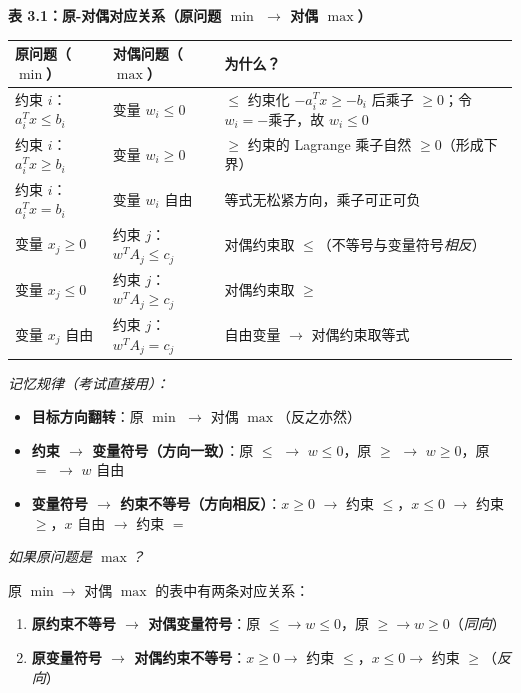 \begin{defbox}
\textbf{表 3.1：原-对偶对应关系（原问题 $\min$ $\to$ 对偶 $\max$）}
\medskip

\begingroup
\footnotesize
\renewcommand{\arraystretch}{1.3}
\begin{tabular}{@{}p{2.6cm}p{3.0cm}p{4.4cm}@{}}
\toprule
\textbf{原问题（$\min$）} & \textbf{对偶问题（$\max$）} & \textbf{为什么？} \\
\midrule
约束 $i$：$a_i^T x \le b_i$ & 变量 $w_i \le 0$ &
  $\le$ 约束化 $-a_i^T x \ge -b_i$ 后乘子 $\ge 0$；令 $w_i=-$乘子，故 $w_i\le0$ \\

约束 $i$：$a_i^T x \ge b_i$ & 变量 $w_i \ge 0$ &
  $\ge$ 约束的 Lagrange 乘子自然 $\ge 0$（形成下界） \\

约束 $i$：$a_i^T x = b_i$  & 变量 $w_i$ 自由 &
  等式无松紧方向，乘子可正可负 \\[3pt]

变量 $x_j \ge 0$  & 约束 $j$：$w^T A_j \le c_j$ &
  对偶约束取 $\le$（不等号与变量符号\emph{相反}） \\

变量 $x_j \le 0$  & 约束 $j$：$w^T A_j \ge c_j$ &
  对偶约束取 $\ge$ \\

变量 $x_j$ 自由   & 约束 $j$：$w^T A_j = c_j$ &
  自由变量 $\to$ 对偶约束取等式 \\
\bottomrule
\end{tabular}
\endgroup
\end{defbox}

\emph{记忆规律（考试直接用）：}
\begin{itemize}
  \item \textbf{目标方向翻转}：原 $\min$ $\to$ 对偶 $\max$（反之亦然）
  \item \textbf{约束 $\to$ 变量符号（方向一致）}：原 $\le$ $\to$ $w\le0$，原 $\ge$ $\to$ $w\ge0$，原 $=$ $\to$ $w$ 自由
  \item \textbf{变量符号 $\to$ 约束不等号（方向相反）}：$x\ge0$ $\to$ 约束 $\le$，$x\le0$ $\to$ 约束 $\ge$，$x$ 自由 $\to$ 约束 $=$
\end{itemize}

\emph{如果原问题是 $\max$？}

原 $\min \to$ 对偶 $\max$ 的表中有两条对应关系：
\begin{enumerate}
  \item \textbf{原约束不等号 $\to$ 对偶变量符号}：原 $\le \to w\le0$，原 $\ge \to w\ge0$（\emph{同向}）
  \item \textbf{原变量符号 $\to$ 对偶约束不等号}：$x\ge0 \to$ 约束 $\le$，$x\le0 \to$ 约束 $\ge$（\emph{反向}）
\end{enumerate}

